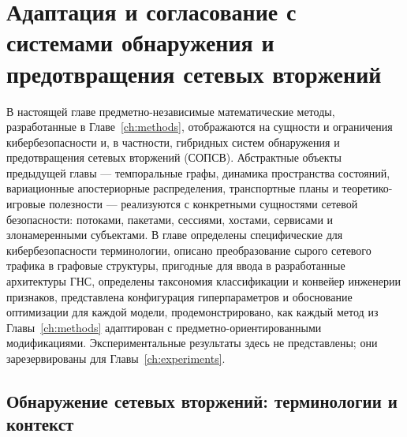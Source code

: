 
\chapter{Адаптация и согласование с системами обнаружения и предотвращения сетевых вторжений}
\label{ch:adaptation}

В настоящей главе предметно-независимые математические методы, разработанные в Главе~\ref{ch:methods}, отображаются на сущности и ограничения кибербезопасности и, в частности, гибридных систем обнаружения и предотвращения сетевых вторжений (СОПСВ). Абстрактные объекты предыдущей главы --- темпоральные графы, динамика пространства состояний, вариационные апостериорные распределения, транспортные планы и теоретико-игровые полезности --- реализуются с конкретными сущностями сетевой безопасности: потоками, пакетами, сессиями, хостами, сервисами и злонамеренными субъектами. В главе определены специфические для кибербезопасности терминологии, описано преобразование сырого сетевого трафика в графовые структуры, пригодные для ввода в разработанные архитектуры ГНС, определены таксономия классификации и конвейер инженерии признаков, представлена конфигурация гиперпараметров и обоснование оптимизации для каждой модели, продемонстрировано, как каждый метод из Главы~\ref{ch:methods} адаптирован с предметно-ориентированными модификациями. Экспериментальные результаты здесь не представлены; они зарезервированы для Главы~\ref{ch:experiments}.


\section{Обнаружение сетевых вторжений: терминологии и контекст}
\label{sec:nidps_context}


